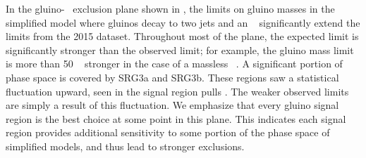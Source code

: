 In the gluino-\lsp~ exclusion plane shown in , the limits on gluino masses in the simplified model where gluinos decay to two jets and an \lsp~ significantly extend the limits from the 2015 dataset.
Throughout most of the plane, the expected limit is significantly stronger than the observed limit; for example, the gluino mass limit is more than 50 \GeV~ stronger in the case of a massless \lsp~.
A significant portion of phase space is covered by SRG3a and SRG3b.
These regions saw a statistical fluctuation upward, seen in the signal region pulls .
The weaker observed limits are simply a result of this fluctuation.
We emphasize that every gluino signal region is the best choice at some point in this plane.
This indicates each signal region provides additional sensitivity to some portion of the phase space of simplified models, and thus lead to stronger exclusions.

